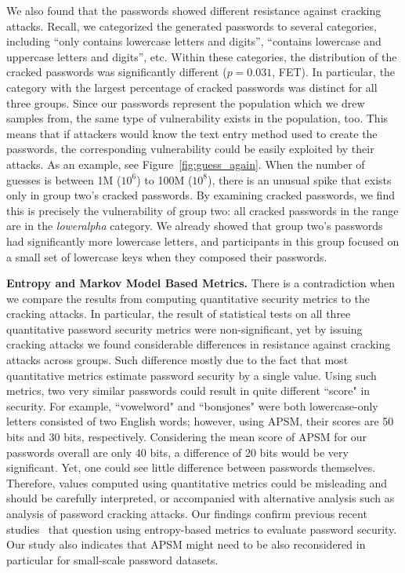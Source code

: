 \documentclass[conference]{IEEEtran}
\begin{document}
We also found that the passwords showed different resistance against cracking attacks. Recall, we categorized the generated passwords to several categories, including ``only contains lowercase letters and digits'', ``contains lowercase and uppercase letters and digits'', etc. Within these categories, the distribution of the cracked passwords was significantly different ($p=0.031$, FET). In particular, the category with the largest percentage of cracked passwords was distinct for all three groups. Since our passwords represent the population which we drew samples from, the same type of vulnerability exists in the population, too. This means that if attackers would know the text entry method used to create the passwords, the corresponding vulnerability could be easily exploited by their attacks. As an example, see Figure~\ref{fig:guess_again}. When the number of guesses is between 1M ($10^{6}$) to 100M ($10^{8}$), there is an unusual spike that exists only in group two's cracked passwords. By examining cracked passwords, we find this is precisely the vulnerability of group two: all cracked passwords in the range are in the \emph{loweralpha} category. We already showed that group two's passwords had significantly more lowercase letters, and participants in this group focused on a small set of lowercase keys when they composed their passwords. 


\textbf{Entropy and Markov Model Based Metrics.} There is a contradiction when we compare the results from computing quantitative security metrics to the cracking attacks. In particular, the result of statistical tests on all three quantitative password security metrics were non-significant, yet by issuing cracking attacks we found considerable differences in resistance against cracking attacks across groups. Such difference mostly due to the fact that most quantitative metrics estimate password security by a single value. Using such metrics, two very similar passwords could result in quite different ``score" in security. For example, ``vowelword" and ``bonsjones" were both lowercase-only letters consisted of two English words; however, using APSM, their scores are 50 bits and 30 bits, respectively. Considering the mean score of APSM for our passwords overall are only 40 bits, a difference of 20 bits would be very significant. Yet, one could see little difference between passwords themselves. Therefore, values computed using quantitative metrics could be misleading and should be carefully interpreted, or accompanied with alternative analysis such as analysis of password cracking attacks. Our findings confirm previous recent studies~\cite{Weir:2010:TMP:1866307.1866327, Bonneau:2012:SGA:2310656.2310721} that question using entropy-based metrics to evaluate password security. Our study also indicates that APSM might need to be also reconsidered in particular for small-scale password datasets.
\end{document}
